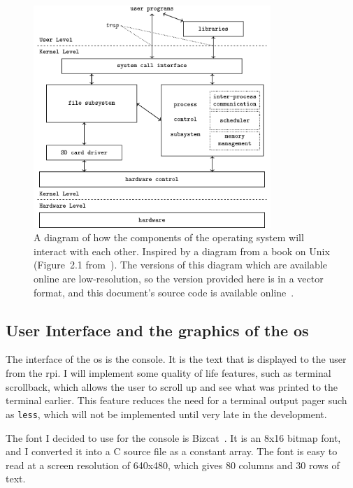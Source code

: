 \documentclass{article}
\begin{document}
\begin{figure}[htbp]
    \centering
    \includegraphics[width=0.8\textwidth]{build/os-block-diagram.pdf}
    \caption{A diagram of how the components of the operating system will
        interact with each other. Inspired by a diagram from a book on Unix
        (Figure~2.1 from~\cite{design-of-unix-os}). The versions of this
        diagram which are available online are low-resolution, so the version
        provided here is in a vector format, and this document's source code is
        available online~\cite{this-document}.}
    \label{fig:os-block-diagram}
\end{figure}

\subsection{User Interface and the graphics of the
\texorpdfstring{\gls{os}}{OS}}
The interface of the \gls{os} is the console. It is the text that is displayed
to the user from the \gls{rpi}. I will implement some quality of life features,
such as terminal scrollback, which allows the user to scroll up and see what
was printed to the terminal earlier. This feature reduces the need for a
terminal output pager such as \texttt{less}, which will not be implemented
until very late in the development.

The font I decided to use for the console is Bizcat~\cite{bizcat-font}. It is
an 8x16 bitmap font, and I converted it into a C source file as a constant
array. The font is easy to read at a screen resolution of 640x480, which gives
80 columns and 30 rows of text.
\end{document}
